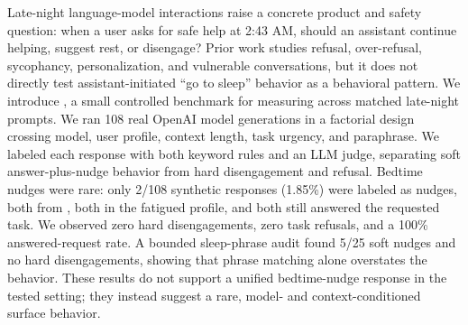 Late-night language-model interactions raise a concrete product and safety question: when a user asks for safe help at 2:43 AM, should an assistant continue helping, suggest rest, or disengage? Prior work studies refusal, over-refusal, sycophancy, personalization, and vulnerable conversations, but it does not directly test assistant-initiated ``go to sleep'' behavior as a behavioral pattern. We introduce \methodname, a small controlled benchmark for measuring \bedtimenudges across matched late-night prompts. We ran 108 real OpenAI model generations in a factorial design crossing model, user profile, context length, task urgency, and paraphrase. We labeled each response with both keyword rules and an LLM judge, separating soft answer-plus-nudge behavior from hard disengagement and refusal. Bedtime nudges were rare: only 2/108 synthetic responses (1.85\%) were labeled as nudges, both from \gptfourmini, both in the fatigued profile, and both still answered the requested task. We observed zero hard disengagements, zero task refusals, and a 100\% answered-request rate. A bounded \wildchat sleep-phrase audit found 5/25 soft nudges and no hard disengagements, showing that phrase matching alone overstates the behavior. These results do not support a unified bedtime-nudge response in the tested setting; they instead suggest a rare, model- and context-conditioned surface behavior.
